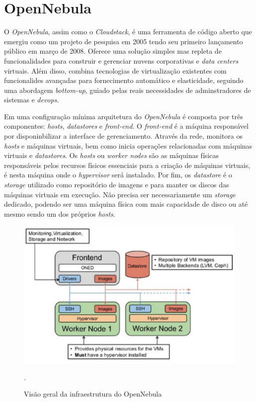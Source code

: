 \section{OpenNebula}
O \textit{OpenNebula}, assim como o \textit{Cloudstack}, é uma ferramenta de código aberto que emergiu como um projeto de pesquisa em 2005 tendo seu primeiro lançamento público em março de 2008. Oferece uma solução simples mas repleta de funcionalidades para construir e gerenciar nuvens corporativas e \textit{data centers} virtuais. Além disso, combina tecnologias de virtualização existentes com funcionalides avançadas para fornecimento automático e elasticidade, seguindo uma abordagem \textit{bottom-up}, guiado pelas reais necessidades de adminstradores de sistemas e \textit{devops}\cite{opennebula}.

Em uma configuração mínima  arquitetura do \textit{OpenNebula} é composta por três componentes: \textit{hosts}, \textit{datastores} e \textit{front-end}. O \textit{front-end} é a máquina responsável por disponinbilizar a interface de gerenciamento. Através da rede, monitora os \textit{hosts} e máquinas virtuais, bem como inicia operações relacionadas com máquinas virtuais e \textit{datastores}. Os \textit{hosts} ou \textit{worker nodes} são as máquinas físicas responsáveis pelos recursos físicos essenciais para a criação de máquinas virtuais, é nesta máquina onde o \textit{hypervisor} será instalado. Por fim, os \textit{datastore} é o \textit{storage} utilizado como repositório de imagens e para manter os discos das máquinas virtuais em execução. Não precisa ser necessariamente um \textit{storage} dedicado, podendo ser uma máquina física com mais capacidade de disco ou até mesmo sendo um dos próprios \textit{hosts}.  

\begin{figure}[!htb]
\centering
\includegraphics [keepaspectratio=true,scale=0.70]{figuras/opennebula_instalation.eps}
\caption{Visão geral da infraestrutura do OpenNebula}
\cite{opennebula}.
\label{diagramaopennebula}
\end{figure}

